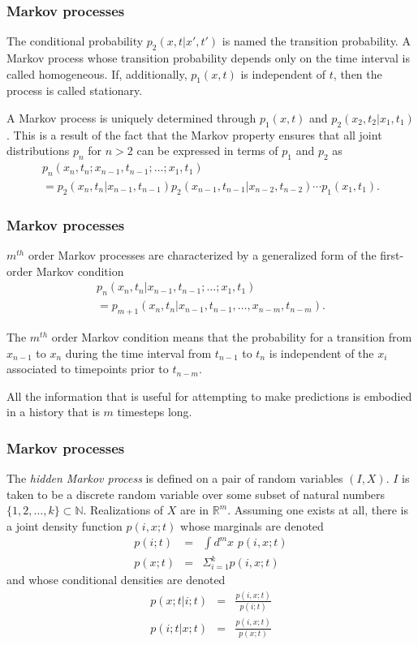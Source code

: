 \begin{frame}
\frametitle{Markov processes}
The conditional probability $p_2(x,t|x',t')$ is named the transition probability. A Markov process whose transition probability depends only on the time interval is called homogeneous. If, additionally, $p_1(x,t)$ is independent of $t$, then the process is called stationary.

A Markov process is uniquely determined through $p_1(x,t)$ and $p_2(x_2,t_2|x_1,t_1)$. This is a result of the fact that the Markov property ensures that all joint distributions $p_n$ for $n>2$ can be expressed in terms of $p_1$ and $p_2$ as
\begin{multline}
p_n(x_n,t_n;x_{n-1},t_{n-1};\ldots;x_1,t_1)\\
= p_2(x_n,t_n|x_{n-1},t_{n-1})p_2(x_{n-1},t_{n-1}|x_{n-2},t_{n-2}) \cdots p_1(x_1,t_1).
\end{multline}

\end{frame}

\begin{frame}
\frametitle{Markov processes}
$m^{th}$ order Markov processes are characterized by a generalized form of the first-order Markov condition
\begin{multline}
p_n(x_n,t_n | x_{n-1},t_{n-1}; \ldots ; x_1,t_1)\\
= p_{m+1}(x_n,t_n|x_{n-1},t_{n-1}, \ldots ,x_{n-m},t_{n-m}).
\end{multline}

The $m^{th}$ order Markov condition means that the probability for a transition from $x_{n-1}$ to $x_n$ during the time interval from $t_{n-1}$ to $t_n$ is independent of the $x_i$ associated to timepoints prior to $t_{n-m}$.

All the information that is useful for attempting to make predictions is embodied in a history that is $m$ timesteps long.
\end{frame}

\begin{frame}
\frametitle{Markov processes}
The \emph{hidden Markov process} is defined on a pair of random variables $(I,X)$. $I$ is taken to be a discrete random variable over some subset of natural numbers $\{1,2, \ldots ,k \} \subset \mathbb{N}$. Realizations of $X$ are in $\mathbb{R}^m$. Assuming one exists at all, there is a joint density function $p(i,x;t)$ whose marginals are denoted
\begin{eqnarray}
p(i;t) &=& \int d^m x \,\, p(i,x;t)\\
p(x;t) &=& \Sigma_{i=1}^k p(i,x;t)
\end{eqnarray}
and whose conditional densities are denoted
\begin{eqnarray}
p(x;t|i;t) &=& \frac{p(i,x;t)}{p(i;t)}\\
p(i;t|x;t) &=& \frac{p(i,x;t)}{p(x;t)}
\end{eqnarray}
\end{frame}

